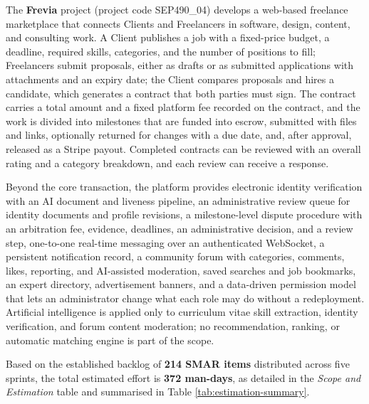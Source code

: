 The \textbf{Frevia} project (project code SEP490\_04) develops a web-based freelance marketplace that connects Clients and Freelancers in software, design, content, and consulting work. A Client publishes a job with a fixed-price budget, a deadline, required skills, categories, and the number of positions to fill; Freelancers submit proposals, either as drafts or as submitted applications with attachments and an expiry date; the Client compares proposals and hires a candidate, which generates a contract that both parties must sign. The contract carries a total amount and a fixed platform fee recorded on the contract, and the work is divided into milestones that are funded into escrow, submitted with files and links, optionally returned for changes with a due date, and, after approval, released as a Stripe payout. Completed contracts can be reviewed with an overall rating and a category breakdown, and each review can receive a response.

Beyond the core transaction, the platform provides electronic identity verification with an AI document and liveness pipeline, an administrative review queue for identity documents and profile revisions, a milestone-level dispute procedure with an arbitration fee, evidence, deadlines, an administrative decision, and a review step, one-to-one real-time messaging over an authenticated WebSocket, a persistent notification record, a community forum with categories, comments, likes, reporting, and AI-assisted moderation, saved searches and job bookmarks, an expert directory, advertisement banners, and a data-driven permission model that lets an administrator change what each role may do without a redeployment. Artificial intelligence is applied only to curriculum vitae skill extraction, identity verification, and forum content moderation; no recommendation, ranking, or automatic matching engine is part of the scope.

Based on the established backlog of \textbf{214 SMAR items} distributed across five sprints, the total estimated effort is \textbf{372 man-days}, as detailed in the \textit{Scope and Estimation} table and summarised in Table \ref{tab:estimation-summary}.


